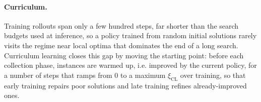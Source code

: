\documentclass[letterpaper]{article} %
\begin{document}

\paragraph{Curriculum.}
Training rollouts span only a few hundred steps, far shorter than the
search budgets used at inference, so a policy trained from random initial
solutions rarely visits the regime near local optima that
dominates the end of a long search. Curriculum learning
\citep{ma_learning_2021} closes this gap by moving the starting point:
before each collection phase, instances are warmed up, i.e. improved by the current
policy, for a number of steps that ramps from $0$ to a maximum
$\xi_{\mathrm{CL}}$ over training, so that early training repairs poor
solutions and late training refines already-improved ones. 
\end{document}
